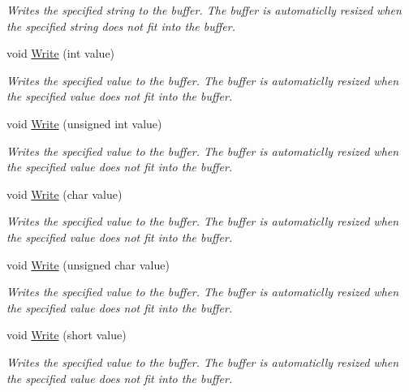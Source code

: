 \begin{DoxyCompactItemize}
\begin{DoxyCompactList}\small\item\em Writes the specified string to the buffer. The buffer is automaticlly resized when the specified string does not fit into the buffer. \end{DoxyCompactList}\item 
void \hyperlink{class_senergy_1_1_byte_buffer_ab523222c96a0c1fff96a7f6c2794ca2d}{Write} (int value)
\begin{DoxyCompactList}\small\item\em Writes the specified value to the buffer. The buffer is automaticlly resized when the specified value does not fit into the buffer. \end{DoxyCompactList}\item 
void \hyperlink{class_senergy_1_1_byte_buffer_a8a51e4f9795d312ff2ab8f152b533bb7}{Write} (unsigned int value)
\begin{DoxyCompactList}\small\item\em Writes the specified value to the buffer. The buffer is automaticlly resized when the specified value does not fit into the buffer. \end{DoxyCompactList}\item 
void \hyperlink{class_senergy_1_1_byte_buffer_add80584faab29bcadcb437b45ad97a87}{Write} (char value)
\begin{DoxyCompactList}\small\item\em Writes the specified value to the buffer. The buffer is automaticlly resized when the specified value does not fit into the buffer. \end{DoxyCompactList}\item 
void \hyperlink{class_senergy_1_1_byte_buffer_a061fe3c4158ba940e68bf4545639561e}{Write} (unsigned char value)
\begin{DoxyCompactList}\small\item\em Writes the specified value to the buffer. The buffer is automaticlly resized when the specified value does not fit into the buffer. \end{DoxyCompactList}\item 
void \hyperlink{class_senergy_1_1_byte_buffer_ae0e9d53b9afa8b098eed7b517a60b938}{Write} (short value)
\begin{DoxyCompactList}\small\item\em Writes the specified value to the buffer. The buffer is automaticlly resized when the specified value does not fit into the buffer. \end{DoxyCompactList}\item 

\end{DoxyCompactItemize}
